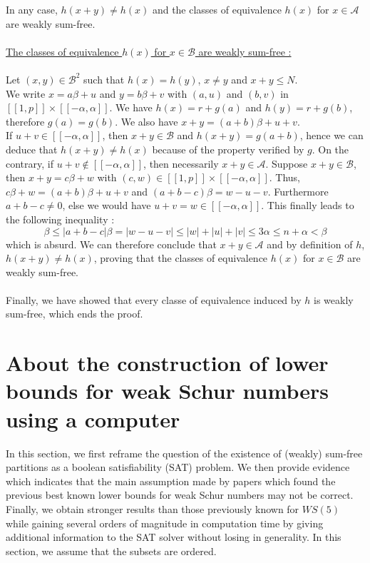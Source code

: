 \documentclass{article}
\newtheorem{computational theorem}{Computational Theorem}[section]
\begin{document}
In any case, $h(x+y) \neq h(x)$ and the classes of equivalence $h(x)$ for $x \in \mathcal{A}$ are weakly sum-free.\\
\\
\underline{The classes of equivalence $h(x)$ for $x \in \mathcal{B}$ are weakly sum-free :}
\\
\\
Let $(x,y) \in \mathcal{B}^2$ such that $h(x) = h(y)$, $x \neq y$ and $x + y \leqslant N$.\\
We write $x = a\beta + u$ and $y = b\beta + v$ with $(a,u)$ and $(b,v)$ in $[\![1,p]\!] \times [\![-\alpha,\alpha]\!]$. We have $h(x) = r + g(a)$ and $h(y) = r + g(b)$, therefore $g(a) = g(b)$. We also have $x+y = (a+b)\beta + u +v$.\\
If $u + v \in [\![-\alpha,\alpha]\!]$, then $x+y \in \mathcal{B}$ and $h(x+y) = g(a+b)$, hence we can deduce that $h(x+y) \neq h(x)$ because of the property verified by $g$. On the contrary, if $u+v \notin [\![-\alpha,\alpha]\!]$, then necessarily $x+y \in \mathcal{A}$. Suppose $x+y \in \mathcal{B}$, then $x+y = c\beta + w$ with $(c,w) \in [\![1,p]\!] \times [\![-\alpha,\alpha]\!]$. Thus, $c\beta + w = (a+b)\beta + u + v$ and $(a+b-c)\beta = w-u-v$. Furthermore $a+b-c \neq 0$, else we would have $u+v = w \in [\![-\alpha,\alpha]\!]$. This finally leads to the following inequality :
\[\beta \leqslant |a+b-c|\beta = |w-u-v| \leqslant |w| + |u| + |v| \leqslant 3\alpha \leqslant n + \alpha < \beta
\]
which is absurd. We can therefore conclude that $x+y \in \mathcal{A}$ and by definition of $h$, $h(x+y) \neq h(x)$, proving that the classes of equivalence $h(x)$ for $x \in \mathcal{B}$ are weakly sum-free.\\
\\
Finally, we have showed that every classe of equivalence induced by $h$ is weakly sum-free, which ends the proof.



\section{About the construction of lower bounds for weak Schur numbers using a computer}

In this section, we first reframe the question of the existence of (weakly) sum-free partitions as a boolean
satisfiability (SAT) problem. We then provide evidence which indicates that the main assumption made by papers which
found the previous best known lower bounds for weak Schur numbers may not be correct. Finally, we obtain stronger
results than those previously known for \(WS(5)\) while gaining several orders of magnitude in computation time by 
giving additional information to the SAT solver without losing in generality. In this section, we assume that the subsets are ordered.
\end{document}

